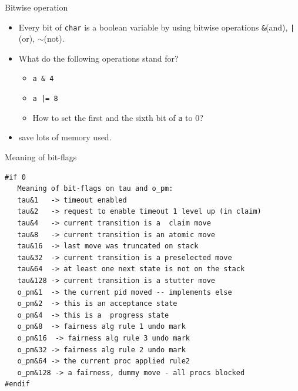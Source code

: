 \documentclass[12pt]{beamer}
\newcommand{\code}[1]{\texttt{#1}}
\begin{document}
\begin{frame}{Bitwise operation}
\begin{itemize}
	\item Every bit of \code{char} is a boolean variable by using bitwise operations \code{\&}(and), \code{|}(or), \code{$\sim$}(not).
	\item What do the following operations stand for?
	\begin{itemize}
		\item \code{a \& 4}\\	\only<2-4>{\textcolor{red}{value of the third bit is 0 or not}}
		\item \code{a |= 8}\\	\only<3-4>{\textcolor{red}{set the 4th bit to 1}}
		\item How to set the first and the sixth bit of \code{a} to 0?\\	\only<4>{\textcolor{red}{\code{a \&= $\sim$(1|32)}}}
	\end{itemize}
	\item save lots of memory used.
\end{itemize}
\end{frame}

\begin{frame}[fragile]{Meaning of bit-flags}
\begin{lstlisting}[basicstyle=\footnotesize\ttfamily]
#if 0
   Meaning of bit-flags on tau and o_pm:
   tau&1   -> timeout enabled
   tau&2   -> request to enable timeout 1 level up (in claim)
   tau&4   -> current transition is a  claim move
   tau&8   -> current transition is an atomic move
   tau&16  -> last move was truncated on stack
   tau&32  -> current transition is a preselected move
   tau&64  -> at least one next state is not on the stack
   tau&128 -> current transition is a stutter move
   o_pm&1  -> the current pid moved -- implements else
   o_pm&2  -> this is an acceptance state
   o_pm&4  -> this is a  progress state
   o_pm&8  -> fairness alg rule 1 undo mark
   o_pm&16  -> fairness alg rule 3 undo mark
   o_pm&32 -> fairness alg rule 2 undo mark
   o_pm&64 -> the current proc applied rule2
   o_pm&128 -> a fairness, dummy move - all procs blocked
#endif
\end{lstlisting}
\end{frame}
\end{document}
